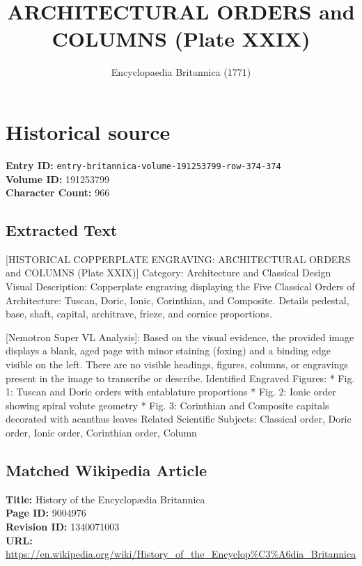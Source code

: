 \documentclass{article}
\title{ARCHITECTURAL ORDERS and COLUMNS (Plate XXIX)}
\date{Encyclopaedia Britannica (1771)}
\begin{document}
\maketitle

\section*{Historical source}
\textbf{Entry ID:} \texttt{entry-britannica-volume-191253799-row-374-374} \\
\textbf{Volume ID:} 191253799 \\
\textbf{Character Count:} 966

\subsection*{Extracted Text}
[HISTORICAL COPPERPLATE ENGRAVING: ARCHITECTURAL ORDERS and COLUMNS (Plate XXIX)]
Category: Architecture and Classical Design
Visual Description: Copperplate engraving displaying the Five Classical Orders of Architecture: Tuscan, Doric, Ionic, Corinthian, and Composite. Details pedestal, base, shaft, capital, architrave, frieze, and cornice proportions.

[Nemotron Super VL Analysis]: Based on the visual evidence, the provided image displays a blank, aged page with minor staining (foxing) and a binding edge visible on the left. There are no visible headings, figures, columns, or engravings present in the image to transcribe or describe.
Identified Engraved Figures:
  * Fig. 1: Tuscan and Doric orders with entablature proportions
  * Fig. 2: Ionic order showing spiral volute geometry
  * Fig. 3: Corinthian and Composite capitals decorated with acanthus leaves
Related Scientific Subjects: Classical order, Doric order, Ionic order, Corinthian order, Column

\subsection*{Matched Wikipedia Article}
\textbf{Title:} History of the Encyclopædia Britannica \\
\textbf{Page ID:} 9004976 \\
\textbf{Revision ID:} 1340071003 \\
\textbf{URL:} \url{https://en.wikipedia.org/wiki/History\_of\_the\_Encyclop\%C3\%A6dia\_Britannica}
\end{document}
